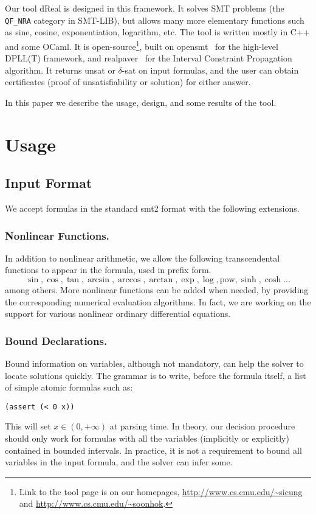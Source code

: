 \documentclass[envcountsect]{llncs}
\begin{document}
Our tool {\sf dReal} is designed in this framework. It solves SMT problems
(the {\tt QF\_NRA} category in SMT-LIB), but allows many more elementary
functions such as sine, cosine, exponentiation, logarithm, etc. The tool is
written mostly in C++ and some OCaml. It is open-source\footnote{Link to the
tool page is on our homepages, \url{http://www.cs.cmu.edu/~sicung} and
\url{http://www.cs.cmu.edu/~soonhok}.
}, built on {\sf opensmt}~\cite{DBLP:conf/tacas/BruttomessoPST10} for the
high-level DPLL(T) framework, and {\sf
realpaver}~\cite{DBLP:journals/toms/GranvilliersB06} for the Interval
Constraint Propagation algorithm. It returns {\sf unsat} or {\sf $\delta$-sat}
on input formulas, and the user can obtain certificates (proof of
unsatisfiability or solution) for either answer.

In this paper we describe the usage, design, and some results of the tool.

\section{Usage}

\subsection{Input Format}

We accept formulas in the standard {\sf smt2} format with the following
extensions.

\subsubsection{Nonlinear Functions.} In addition to nonlinear arithmetic, we
allow the following transcendental functions to appear in the formula, used in
prefix form.
 $$\sin, \cos, \tan, \arcsin, \arccos, \arctan, \exp, \log, \mbox{pow}, \sinh,
\cosh ... $$
among others. More nonlinear functions can be added when needed, by providing
the corresponding numerical evaluation algorithms. In fact, we are working on
the support for various nonlinear ordinary differential equations.

\subsubsection{Bound Declarations.} Bound information on variables, although not
mandatory, can help the solver to locate solutions quickly. The grammar is to
write, before the formula itself, a list of simple atomic formulas such as:
\begin{verbatim}
(assert (< 0 x))
\end{verbatim}
This will set $x\in (0, +\infty)$ at parsing time. In theory, our
decision procedure should only work for formulas with all the variables
(implicitly or explicitly) contained in bounded intervals. In practice, it is
not a requirement to bound all variables in the input formula, and the solver
can infer some.
\end{document}
